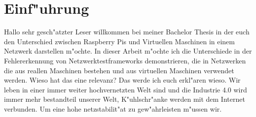 \chapter{Einf"uhrung}
\label{cha:einfuehrung}

Hallo sehr gesch"atzter Leser willkommen bei meiner Bachelor Thesis in%
  der euch den Unterschied zwischen Raspberry Pis und Virtuellen Maschinen%
  in einem Netzwerk darstellen m"ochte. In dieser Arbeit m"ochte ich die%
  Unterschiede in der Fehlererkennung von Netzwerktestframeworks demonstrieren,%
  die in Netzwerken die aus reallen Maschinen bestehen und aus virtuellen%
  Maschinen verwendet werden. Wieso hat das eine relevanz? Das werde ich euch%
  erkl"aren wieso. Wir leben in einer immer weiter hochvernetzten Welt sind%
  und die Industrie 4.0 wird immer mehr bestandteil unserer Welt, K"uhlschr"anke%
  werden mit dem Internet verbunden. Um eine hohe netzstabilit"at zu%
  gew"ahrleisten m"ussen wir.



\newpage

